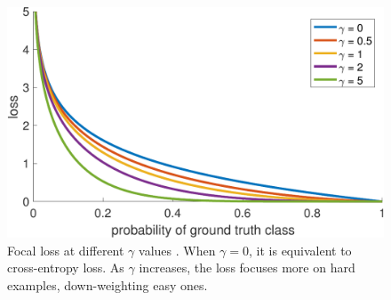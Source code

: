 \begin{figure}[h]
    \centering
    \includegraphics[width=0.55\linewidth]{images/focal-loss.pdf}
    \caption{Focal loss at different $\gamma$ values \cite{lin2018focalloss}. When $\gamma=0$, it is equivalent to cross-entropy loss. As $\gamma$ increases, the loss focuses more on hard examples, down-weighting easy ones.}
    \label{fig:focal-loss}
\end{figure}
